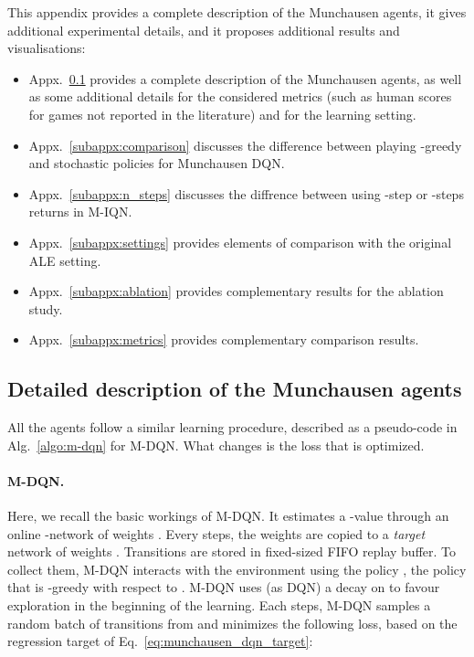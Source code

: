 \documentclass{article}
\begin{document}
This appendix provides a complete description of the Munchausen agents, it gives additional experimental details, and it proposes additional results and visualisations:
\begin{itemize}
    \item Appx.~\ref{subappx:m-agent} provides a complete description of the Munchausen agents, as well as some additional details for the considered metrics (such as human scores for games not reported in the literature) and for the learning setting.
    \item Appx.~\ref{subappx:comparison} discusses the difference between playing -greedy and stochastic policies for Munchausen DQN.
    \item Appx.~\ref{subappx:n_steps} discusses the diffrence between using -step or -steps returns in M-IQN.
    \item Appx.~\ref{subappx:settings} provides elements of comparison with the original ALE setting.
    \item Appx.~\ref{subappx:ablation} provides complementary results for the ablation study.
    \item Appx.~\ref{subappx:metrics} provides complementary comparison results.
\end{itemize}

\subsection{Detailed description of the Munchausen agents}
\label{subappx:m-agent}
All the agents follow a similar learning procedure, described as a pseudo-code in Alg.~\ref{algo:m-dqn} for M-DQN. What changes is the loss that is optimized.

\paragraph{M-DQN.} Here, we  recall the basic workings of M-DQN. It estimates a -value through an online -network  of weights . Every  steps, the weights are copied to a \emph{target} network  of weights . Transitions  are stored in fixed-sized FIFO replay buffer. To collect them, M-DQN interacts with the environment using the policy , the policy that is -greedy with respect to . M-DQN uses (as DQN) a decay on  to favour exploration in the beginning of the learning. Each  steps, M-DQN samples a random batch   of transitions from  and minimizes the following loss, based on the regression target of Eq.~\eqref{eq:munchausen_dqn_target}:
\end{document}
